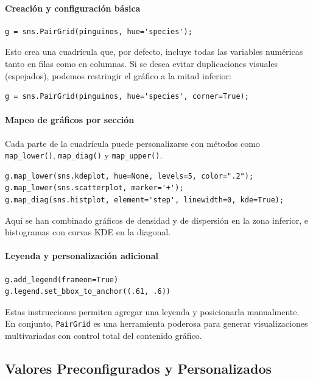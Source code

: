 \documentclass{article}
\theoremstyle{nonumberplain}
\begin{document}
\paragraph{Creación y configuración básica}

\begin{verbatim}
g = sns.PairGrid(pinguinos, hue='species');
\end{verbatim}

Esto crea una cuadrícula que, por defecto, incluye todas las variables numéricas tanto en filas como en columnas. Si se desea evitar duplicaciones visuales (espejados), podemos restringir el gráfico a la mitad inferior:

\begin{verbatim}
g = sns.PairGrid(pinguinos, hue='species', corner=True);
\end{verbatim}

\paragraph{Mapeo de gráficos por sección}

Cada parte de la cuadrícula puede personalizarse con métodos como \texttt{map\_lower()}, \texttt{map\_diag()} y \texttt{map\_upper()}.

\begin{verbatim}
g.map_lower(sns.kdeplot, hue=None, levels=5, color=".2");
g.map_lower(sns.scatterplot, marker='+');
g.map_diag(sns.histplot, element='step', linewidth=0, kde=True);
\end{verbatim}

Aquí se han combinado gráficos de densidad y de dispersión en la zona inferior, e histogramas con curvas KDE en la diagonal.

\paragraph{Leyenda y personalización adicional}

\begin{verbatim}
g.add_legend(frameon=True)
g.legend.set_bbox_to_anchor((.61, .6))
\end{verbatim}

Estas instrucciones permiten agregar una leyenda y posicionarla manualmente. En conjunto, \texttt{PairGrid} es una herramienta poderosa para generar visualizaciones multivariadas con control total del contenido gráfico.



\subsection*{Valores Preconfigurados y Personalizados}
\end{document}
